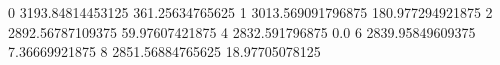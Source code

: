 0 3193.84814453125 361.25634765625
1 3013.569091796875 180.977294921875
2 2892.56787109375 59.97607421875
4 2832.591796875 0.0
6 2839.95849609375 7.36669921875
8 2851.56884765625 18.97705078125
